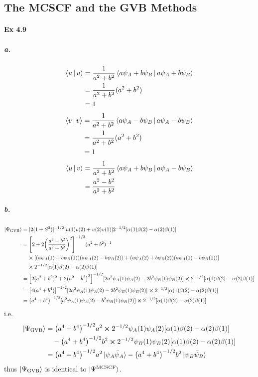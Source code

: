 \documentclass[a4paper]{article}
\DeclareMathOperator{\gvb}{\mathrm{GVB}}
\newcommand{\ex}[1]{\paragraph{Ex #1}}
\newcommand{\subex}[1]{\subparagraph{#1}}
\numberwithin{equation}{subsection}
\begin{document}
\subsection{The MCSCF and the GVB Methods}
\ex{4.9}
\subex{a.}
\begin{align}
\Braket{u|u} &= \dfrac{1}{a^2 + b^2} \Braket{a\psi_A + b\psi_B | a\psi_A + b\psi_B} \notag\\
&= \dfrac{1}{a^2 + b^2} (a^2 + b^2) \notag\\
&= 1
\end{align}
\begin{align}
\Braket{v|v} &= \dfrac{1}{a^2 + b^2} \Braket{a\psi_A - b\psi_B | a\psi_A - b\psi_B} \notag\\
&= \dfrac{1}{a^2 + b^2} (a^2 + b^2) \notag\\
&= 1
\end{align}
\begin{align}
\Braket{u|v} &= \dfrac{1}{a^2 + b^2} \Braket{a\psi_A + b\psi_B | a\psi_A - b\psi_B} \notag\\
&= \dfrac{a^2 - b^2}{a^2 + b^2} 
\end{align}
\subex{b.}
\begin{align}
\ket{\Psi_{\gvb}} &= [2(1 + S^2)]^{-1/2} [u(1)v(2) + u(2)v(1)] 2^{-1/2} [\alpha(1)\beta(2) - \alpha(2)\beta(1)] \notag\\
&= \qty[2 + 2\qty(\dfrac{a^2-b^2}{a^2+b^2})^2]^{-1/2} (a^2 + b^2)^{-1} \notag\\
&{}\quad \cross [(a\psi_A(1) + b\psi_B(1))(a\psi_A(2) - b\psi_B(2)) + (a\psi_A(2) + b\psi_B(2))(a\psi_A(1) - b\psi_B(1))] \notag\\
&{}\quad \cross 2^{-1/2} [\alpha(1)\beta(2) - \alpha(2)\beta(1)] \notag\\
&= \qty[2(a^2 + b^2)^2 + 2\qty(a^2-b^2)^2]^{-1/2} [2a^2\psi_A(1)\psi_A(2) - 2b^2\psi_B(1)\psi_B(2)] \cross 2^{-1/2} [\alpha(1)\beta(2) - \alpha(2)\beta(1)] \notag\\
&= \qty[4(a^4 + b^4)]^{-1/2} [2a^2\psi_A(1)\psi_A(2) - 2b^2\psi_B(1)\psi_B(2)] \cross 2^{-1/2} [\alpha(1)\beta(2) - \alpha(2)\beta(1)] \notag\\
&= \qty(a^4 + b^4)^{-1/2} [a^2\psi_A(1)\psi_A(2) - b^2\psi_B(1)\psi_B(2)] \cross 2^{-1/2} [\alpha(1)\beta(2) - \alpha(2)\beta(1)]
\end{align}
i.e.
\begin{align}
\ket{\Psi_{\gvb}} &= \qty(a^4 + b^4)^{-1/2}a^2 \cross 2^{-1/2} \psi_A(1)\psi_A(2)[\alpha(1)\beta(2) - \alpha(2)\beta(1)] \notag\\
&{}\quad - \qty(a^4 + b^4)^{-1/2}b^2 \cross 2^{-1/2} \psi_B(1)\psi_B(2)[\alpha(1)\beta(2) - \alpha(2)\beta(1)]  \notag\\
&= \qty(a^4 + b^4)^{-1/2}a^2 \ket{\psi_A\bar\psi_A} - \qty(a^4 + b^4)^{-1/2}b^2 \ket{\psi_B\bar\psi_B}
\end{align}
thus $ \ket{\Psi_{\gvb}} $ is identical to $ \ket{\Psi^{\text{MCSCF}}} $.
\end{document}
